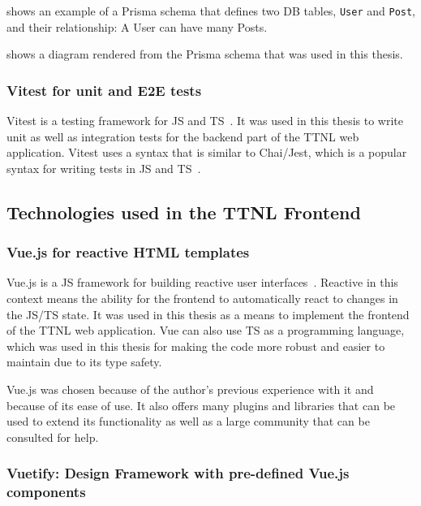 shows an example of a Prisma schema that defines two \ac{DB} tables, \lstinline{User} and \lstinline{Post}, and their relationship: A User can have many Posts.

 shows a diagram rendered from the Prisma schema that was used in this thesis.

\subsubsection{Vitest for unit and \acl{E2E} tests}

Vitest is a testing framework for \ac{JS} and \ac{TS}~\cite{vitest_team_vitest-features_2023}.
It was used in this thesis to write unit as well as integration tests for the backend part of the \ac{TTNL} web application.
Vitest uses a syntax that is similar to Chai/Jest, which is a popular syntax for writing tests in \ac{JS} and \ac{TS}~\cite{vitest_team_vitest-features_2023}.

\subsection{Technologies used in the \acl{TTNL} Frontend}

\subsubsection{Vue.js for reactive \acl{HTML} templates}

Vue.js is a \ac{JS} framework for building reactive user interfaces~\cite{evan_you_vuejs_2023}.
Reactive in this context means the ability for the frontend to automatically react to changes in the \ac{JS}/\ac{TS} state.
It was used in this thesis as a means to implement the frontend of the \ac{TTNL} web application.
Vue can also use \ac{TS} as a programming language, which was used in this thesis for making the code more robust and easier to maintain due to its type safety.

Vue.js was chosen because of the author's previous experience with it and because of its ease of use.
It also offers many plugins and libraries that can be used to extend its functionality as well as a large community that can be consulted for help.

\subsubsection{Vuetify: Design Framework with pre-defined Vue.js components}

